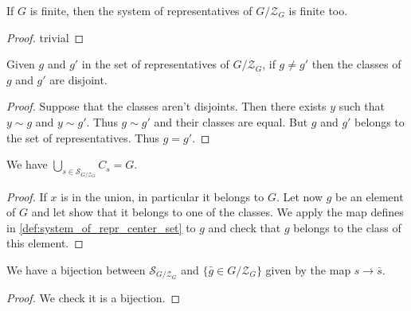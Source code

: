 \begin{proposition}
    \label{prop:system_of_repr_center_set_finite}
    \leanok
    If $G$ is finite, then the system of representatives of $G/\mathcal{Z}_G$ is finite too.
\end{proposition}
\begin{proof}
    \leanok
    trivial
\end{proof}

\begin{proposition}
    \label{prop:system_of_repr_center_set_classes_disjoints}
    \leanok
    Given $g$ and $g'$ in the set of representatives of $G/\mathcal{Z}_G$, if $g\ne g'$
    then the classes of $g$ and $g'$ are disjoint.
\end{proposition}
\begin{proof}
    \leanok
    Suppose that the classes aren't disjoints. Then there exists $y$
    such that $y\sim g$ and $y\sim g'$. Thus $g \sim g'$ and their classes
    are equal. But $g$ and $g'$ belongs to the set of representatives.
    Thus $g=g'$.
\end{proof}

\begin{proposition}
    \label{prop:system_of_repr_center_set_union}
    \leanok
    We have $\bigcup\limits_{s\in \mathcal{S}_{G/\mathcal{Z}_G}} C_s= G$.
\end{proposition}
\begin{proof}
    \leanok
    If $x$ is in the union, in particular it belongs to $G$. Let now $g$ be an element of $G$
    and let show that it belongs to one of the classes. We apply the map defines in \ref{def:system_of_repr_center_set}
    to $g$ and check that $g$ belongs to the class of this element.
\end{proof}

\begin{proposition}
    \label{def:system_of_repr_center_set_bij}
    \leanok
    We have a bijection between $\mathcal{S}_{G/\mathcal{Z}_G}$ and $\{\bar{g} \in G/\mathcal{Z}_G\}$
    given by the map $s\to \bar{s}$.
\end{proposition}
\begin{proof}
    \leanok
    We check it is a bijection.
\end{proof}

